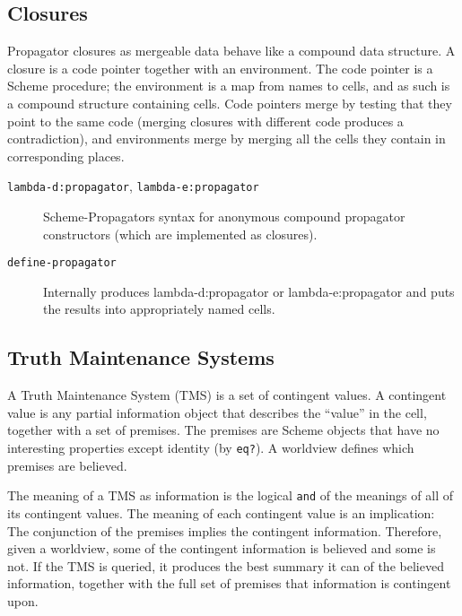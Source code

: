 \documentclass[12pt,letterpaper,english]{article}
\begin{document}

\subsection{Closures}
\label{closures}

Propagator closures as mergeable data behave like a compound data
structure.  A closure is a code pointer together with an environment.
The code pointer is a Scheme procedure; the environment is a map from
names to cells, and as such is a compound structure containing cells.
Code pointers merge by testing that they point to the same code
(merging closures with different code produces a contradiction), and
environments merge by merging all the cells they contain in
corresponding places.
\begin{description}
\item[{\texttt{lambda-d:propagator}, \texttt{lambda-e:propagator}}] \leavevmode 
Scheme-Propagators syntax for anonymous compound propagator
constructors (which are implemented as closures).

\item[{\texttt{define-propagator}}] \leavevmode 
Internally produces lambda-d:propagator or lambda-e:propagator
and puts the results into appropriately named cells.

\end{description}



\subsection{Truth Maintenance Systems}
\label{truth-maintenance-systems}

A Truth Maintenance System (TMS) is a set of contingent values.  A
contingent value is any partial information object that describes the
``value'' in the cell, together with a set of premises.  The premises
are Scheme objects that have no interesting properties except identity
(by \texttt{eq?}).  A worldview defines which premises are believed.

The meaning of a TMS as information is the logical \texttt{and} of the
meanings of all of its contingent values.  The meaning of each
contingent value is an implication: The conjunction of the premises
implies the contingent information.  Therefore, given a worldview,
some of the contingent information is believed and some is not.  If
the TMS is queried, it produces the best summary it can of the
believed information, together with the full set of premises that
information is contingent upon.
\end{document}

